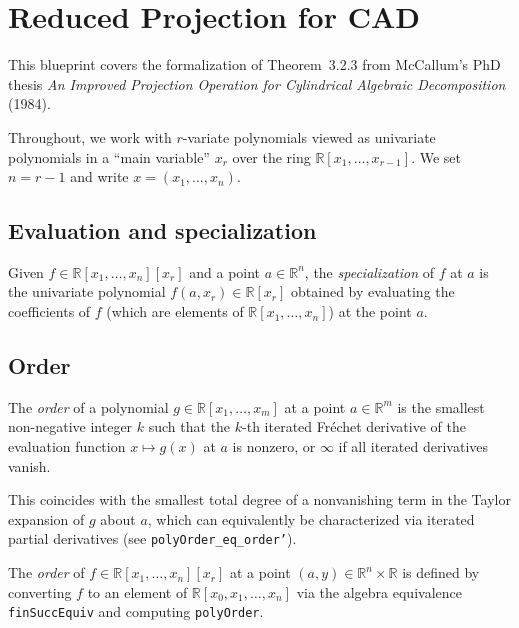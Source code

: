 \chapter{Reduced Projection for CAD}

This blueprint covers the formalization of Theorem~3.2.3 from McCallum's PhD thesis
\emph{An Improved Projection Operation for Cylindrical Algebraic Decomposition} (1984).

Throughout, we work with $r$-variate polynomials viewed as univariate polynomials in
a ``main variable'' $x_r$ over the ring $\mathbb{R}[x_1, \ldots, x_{r-1}]$.
We set $n = r - 1$ and write $x = (x_1, \ldots, x_n)$.

\section{Evaluation and specialization}

\begin{definition}[Specialize]
  \label{def:specialize}
  \leanok
  Given $f \in \mathbb{R}[x_1,\ldots,x_n][x_r]$ and a point $a \in \mathbb{R}^n$,
  the \emph{specialization} of $f$ at $a$ is the univariate polynomial
  $f(a, x_r) \in \mathbb{R}[x_r]$ obtained by evaluating the coefficients of $f$
  (which are elements of $\mathbb{R}[x_1,\ldots,x_n]$) at the point $a$.
\end{definition}

\section{Order}

\begin{definition}
  \label{def:polyOrder}
  \leanok
  The \emph{order} of a polynomial $g \in \mathbb{R}[x_1,\ldots,x_m]$ at a point
  $a \in \mathbb{R}^m$ is the smallest non-negative integer $k$ such that the
  $k$-th iterated Fr\'echet derivative of the evaluation function
  $x \mapsto g(x)$ at $a$ is nonzero, or $\infty$ if all iterated derivatives vanish.

  This coincides with the smallest total degree of a nonvanishing term in the
  Taylor expansion of $g$ about $a$, which can equivalently be characterized
  via iterated partial derivatives (see \texttt{polyOrder\_eq\_order'}).
\end{definition}

\begin{definition}
  \label{def:orderFull}
  \leanok
  The \emph{order} of $f \in \mathbb{R}[x_1,\ldots,x_n][x_r]$ at a point
  $(a, y) \in \mathbb{R}^n \times \mathbb{R}$ is defined by converting $f$ to an
  element of $\mathbb{R}[x_0, x_1,\ldots,x_n]$ via the algebra equivalence
  \texttt{finSuccEquiv} and computing \texttt{polyOrder}.
\end{definition}

